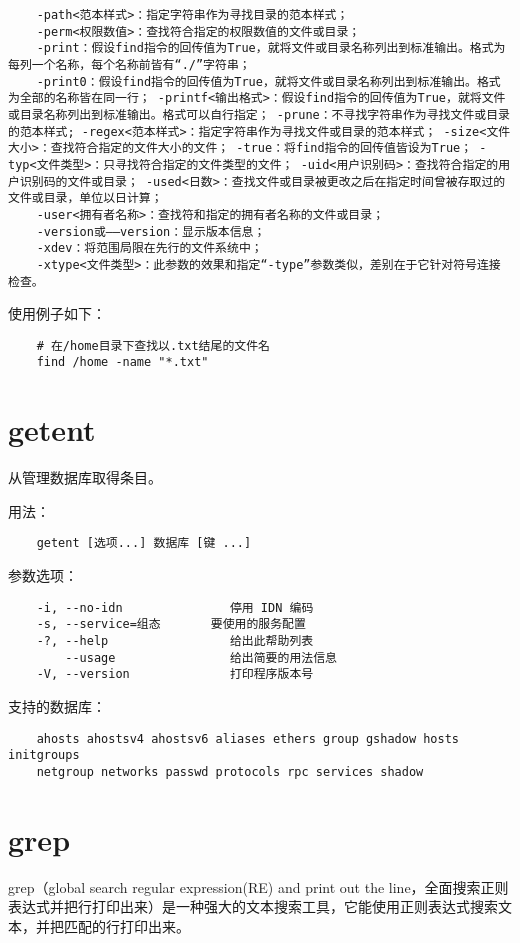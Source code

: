 \documentclass[a4paper,left=2.5cm,right=2.5cm,11pt]{article}
\begin{document}
\begin{lstlisting}
	-path<范本样式>：指定字符串作为寻找目录的范本样式； 
	-perm<权限数值>：查找符合指定的权限数值的文件或目录； 
	-print：假设find指令的回传值为True，就将文件或目录名称列出到标准输出。格式为每列一个名称，每个名称前皆有“./”字符串； 
	-print0：假设find指令的回传值为True，就将文件或目录名称列出到标准输出。格式为全部的名称皆在同一行； -printf<输出格式>：假设find指令的回传值为True，就将文件或目录名称列出到标准输出。格式可以自行指定； -prune：不寻找字符串作为寻找文件或目录的范本样式; -regex<范本样式>：指定字符串作为寻找文件或目录的范本样式； -size<文件大小>：查找符合指定的文件大小的文件； -true：将find指令的回传值皆设为True； -typ<文件类型>：只寻找符合指定的文件类型的文件； -uid<用户识别码>：查找符合指定的用户识别码的文件或目录； -used<日数>：查找文件或目录被更改之后在指定时间曾被存取过的文件或目录，单位以日计算； 
	-user<拥有者名称>：查找符和指定的拥有者名称的文件或目录； 
	-version或——version：显示版本信息； 
	-xdev：将范围局限在先行的文件系统中； 
	-xtype<文件类型>：此参数的效果和指定“-type”参数类似，差别在于它针对符号连接检查。
	\end{lstlisting}

	使用例子如下：
	\begin{lstlisting}
	# 在/home目录下查找以.txt结尾的文件名
	find /home -name "*.txt"
	\end{lstlisting}

\section{getent}
	从管理数据库取得条目。

	用法： 
	\begin{lstlisting}
	getent [选项...] 数据库 [键 ...]
	\end{lstlisting}
	
	参数选项：
	\begin{lstlisting}
	-i, --no-idn               停用 IDN 编码
	-s, --service=组态       要使用的服务配置
	-?, --help                 给出此帮助列表
		--usage                给出简要的用法信息
	-V, --version              打印程序版本号
	\end{lstlisting}

	支持的数据库：
	\begin{lstlisting}
	ahosts ahostsv4 ahostsv6 aliases ethers group gshadow hosts initgroups
	netgroup networks passwd protocols rpc services shadow
	\end{lstlisting}

\section{grep}
	grep（global search regular expression(RE) and print out the line，全面搜索正则表达式并把行打印出来）是一种强大的文本搜索工具，它能使用正则表达式搜索文本，并把匹配的行打印出来。
\end{document}
